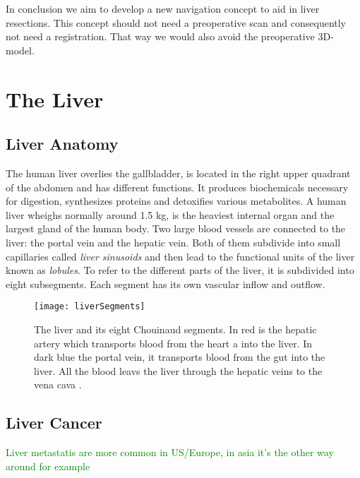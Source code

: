 In conclusion we aim to develop a new navigation concept to aid
in liver resections.
This concept should not need a preoperative scan and consequently
not need a registration. That way we would also avoid the preoperative 3D-model. 





\section{The Liver} 
\subsection{Liver Anatomy}
The human liver overlies the gallbladder, is located in the right upper quadrant of the abdomen and has
different functions. It produces biochemicals necessary for digestion,
synthesizes proteins and detoxifies various metabolites. A human liver wheighs
normally around 1.5 kg, is the heaviest internal organ and the largest gland
of the human body. Two large blood vessels are connected to the liver: the
portal vein and the hepatic vein. Both of them subdivide into small
capillaries called \textit{liver sinusoids} and then lead to the functional
units of the liver known as \textit{lobules}. To refer to the different parts of
the liver, it is subdivided into eight subsegments. Each segment has its own
vascular inflow and outflow.
\begin{figure}[H]
  \centering
 \texttt{[image: liverSegments]}
  \caption{The liver and its eight Chouinaud segments. In red is the hepatic
    artery which transports blood from the heart a into the liver. In dark blue
    the portal vein, it transports blood from the gut into the liver. All the
    blood leavs the liver through the hepatic veins to the vena cava \cite{siriwardena2014management}.}
  \label{fig:liverSegments}
\end{figure}

\subsection{Liver Cancer}
\textcolor{green}{Liver metastatis are more common in US/Europe, in asia it's the other way around for example}

